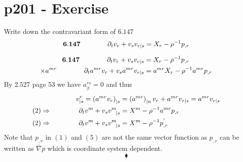\section{p201 - Exercise}
\begin{tcolorbox}
Write down the contravariant form of $\mathbf{6.147}$
$$\mathbf{6.147} \quad\quad\quad\quad \partial_t v_r + v_s v_{r|s} = X_r - \rho^{-1} p_{,r}$$
\end{tcolorbox}
\begin{align}
\mathbf{6.147} \quad\quad\quad\quad \partial_t v_r + v_s v_{r|s} &= X_r - \rho^{-1} p_{,r}\\
\times a^{mr}\quad\quad\quad\quad \partial_t a^{mr} v_r + v_s a^{mr}v_{r|s} &= a^{mr}X_r - \rho^{-1} a^{mr}p_{,r}
\end{align}
By $\mathbf{2.527}$ page 53 we  have $a^{rs}_{|t}=0$ and thus 
\begin{align}
v^{r}_{|s}= \left(a^{mr}v_{r}\right)_{|s} &= \left(a^{mr}\right)_{|n}v_{r}+a^{mr}v_{r|s}= a^{mr}v_{r|s} \\
(2) \Rightarrow \quad\quad\quad\quad \partial_t  v^m + v_s v^{m}_{\ \ |s} &= X^m - \rho^{-1} a^{mr}p_{,r}\\
(2) \Rightarrow \quad\quad\quad\quad \partial_t  v^m + v_s v^{m}_{\ \ |s} &= X^m - \rho^{-1} p^{'}_{,r}
\end{align}
Note that $p_{,r}$ in $(1)$ and $(5)$ are not the same vector function as $p_{,r}$ can be written as $\overline{\nabla}p$ which is coordinate system  dependent.
 $$\blacklozenge$$
\newpage

